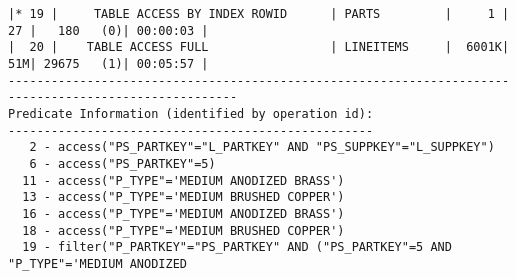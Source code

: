 \documentclass[10pt]{article}
\begin{document}
\begin{lstlisting}[style=queryexecutionplan]
|* 19 |     TABLE ACCESS BY INDEX ROWID      | PARTS         |     1 |    27 |   180   (0)| 00:00:03 |
|  20 |    TABLE ACCESS FULL                 | LINEITEMS     |  6001K|    51M| 29675   (1)| 00:05:57 |
------------------------------------------------------------------------------------------------------
Predicate Information (identified by operation id):
---------------------------------------------------
   2 - access("PS_PARTKEY"="L_PARTKEY" AND "PS_SUPPKEY"="L_SUPPKEY")
   6 - access("PS_PARTKEY"=5)
  11 - access("P_TYPE"='MEDIUM ANODIZED BRASS')
  13 - access("P_TYPE"='MEDIUM BRUSHED COPPER')
  16 - access("P_TYPE"='MEDIUM ANODIZED BRASS')
  18 - access("P_TYPE"='MEDIUM BRUSHED COPPER')
  19 - filter("P_PARTKEY"="PS_PARTKEY" AND ("PS_PARTKEY"=5 AND "P_TYPE"='MEDIUM ANODIZED 
\end{lstlisting}
\end{document}
